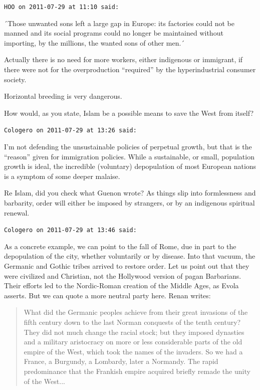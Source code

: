 \begin{footnotesize}
\begin{sffamily}
\texttt{HOO on 2011-07-29 at 11:10 said:}

´Those unwanted sons left a large gap in Europe: its factories could not be manned and its social programs could no longer be maintained without importing, by the millions, the wanted sons of other men.´

Actually there is no need for more workers, either indigenous or immigrant, if there were not for the overproduction ``required'' by the hyperindustrial consumer society.

Horizontal breeding is very dangerous.

How would, as you state, Islam be a possible means to save the West from itself?

\hfill

\texttt{Cologero on 2011-07-29 at 13:26 said:}

I'm not defending the unsustainable policies of perpetual growth, but that is the ``reason'' given for immigration policies. While a sustainable, or small, population growth is ideal, the incredible (voluntary) depopulation of most European nations is a symptom of some deeper malaise.

Re Islam, did you check what Guenon wrote? As things slip into formlessness and barbarity, order will either be imposed by strangers, or by an indigenous spiritual renewal.

\hfill

\texttt{Cologero on 2011-07-29 at 13:46 said:}

As a concrete example, we can point to the fall of Rome, due in part to the depopulation of the city, whether voluntarily or by disease. Into that vacuum, the Germanic and Gothic tribes arrived to restore order. Let us point out that they were civilized and Christian, not the Hollywood version of pagan Barbarians. Their efforts led to the Nordic-Roman creation of the Middle Ages, as Evola asserts. But we can quote a more neutral party here. Renan writes:

\begin{quote}\footnotesize
What did the Germanic peoples achieve from their great invasions of the fifth century down to the last Norman conquests of the tenth century? They did not much change the racial stock; but they imposed dynasties and a military aristocracy on more or less considerable parts of the old empire of the West, which took the names of the invaders. So we had a France, a Burgundy, a Lombardy, later a Normandy. The rapid predominance that the Frankish empire acquired briefly remade the unity of the West...
\end{quote}



\end{sffamily}
\end{footnotesize}
